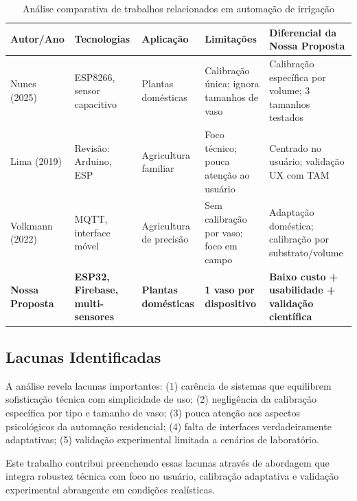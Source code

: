 \documentclass[oneside,english,brazilian]{UNISINOSmonografia}
\begin{document}
\begin{table}[htbp]
\centering
\caption{Análise comparativa de trabalhos relacionados em automação de irrigação}
\label{tab:comparativo}
\scriptsize
\begin{tabular}{p{2.2cm}p{2.0cm}p{2.6cm}p{2.8cm}p{3.0cm}}
\toprule
\textbf{Autor/Ano} & \textbf{Tecnologias} & \textbf{Aplicação} & \textbf{Limitações} & \textbf{Diferencial da Nossa Proposta} \\
\midrule
Nunes (2025) & ESP8266, sensor capacitivo & Plantas domésticas & Calibração única; ignora tamanhos de vaso & Calibração específica por volume; 3 tamanhos testados \\
\midrule
Lima (2019) & Revisão: Arduino, ESP & Agricultura familiar & Foco técnico; pouca atenção ao usuário & Centrado no usuário; validação UX com TAM \\
\midrule
Volkmann (2022) & MQTT, interface móvel & Agricultura de precisão & Sem calibração por vaso; foco em campo & Adaptação doméstica; calibração por substrato/volume \\
\midrule
\textbf{Nossa Proposta} & \textbf{ESP32, Firebase, multi-sensores} & \textbf{Plantas domésticas} & \textbf{1 vaso por dispositivo} & \textbf{Baixo custo + usabilidade + validação científica} \\
\bottomrule
\end{tabular}
\end{table}

\subsection{Lacunas Identificadas}

A análise revela lacunas importantes: (1) carência de sistemas que equilibrem sofisticação técnica com simplicidade de uso; (2) negligência da calibração específica por tipo e tamanho de vaso; (3) pouca atenção aos aspectos psicológicos da automação residencial; (4) falta de interfaces verdadeiramente adaptativas; (5) validação experimental limitada a cenários de laboratório.

Este trabalho contribui preenchendo essas lacunas através de abordagem que integra robustez técnica com foco no usuário, calibração adaptativa e validação experimental abrangente em condições realísticas.


\end{document}
